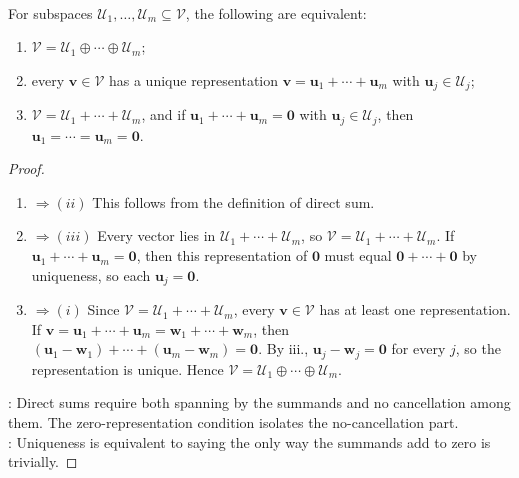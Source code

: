\begin{proposition} \label{prop:direct-sum-equivalent-conditions} \\
For subspaces $\mathcal{U}_1, \ldots, \mathcal{U}_m \subseteq \mathcal{V}$, the following are equivalent:
\begin{enumerate}[label=\roman*.]
\setlength{\itemsep}{0pt}
\item $\mathcal{V} = \mathcal{U}_1 \oplus \cdots \oplus \mathcal{U}_m$;
\item every $\mathbf{v} \in \mathcal{V}$ has a unique representation $\mathbf{v} = \mathbf{u}_1 + \cdots + \mathbf{u}_m$ with $\mathbf{u}_j \in \mathcal{U}_j$;
\item $\mathcal{V}=\mathcal{U}_1+\cdots+\mathcal{U}_m$, and if $\mathbf{u}_1 + \cdots + \mathbf{u}_m = \mathbf{0}$ with $\mathbf{u}_j \in \mathcal{U}_j$, then $\mathbf{u}_1 = \cdots = \mathbf{u}_m = \mathbf{0}$.
\end{enumerate}
\begin{proof}
\begin{enumerate}[label=(\roman)*.]
\setlength{\itemsep}{0pt}
\item[$(i)$]$\Rightarrow (ii)$ This follows from the definition of direct sum.
\item[$(ii)$]$\Rightarrow (iii)$ Every vector lies in $\mathcal{U}_1+\cdots+\mathcal{U}_m$, so $\mathcal{V}=\mathcal{U}_1+\cdots+\mathcal{U}_m$. If $\mathbf{u}_1+\cdots+\mathbf{u}_m=\mathbf{0}$, then this representation of $\mathbf{0}$ must equal $\mathbf{0}+\cdots+\mathbf{0}$ by uniqueness, so each $\mathbf{u}_j=\mathbf{0}$.
\item[$(iii)$]$\Rightarrow (i)$ Since $\mathcal{V}=\mathcal{U}_1+\cdots+\mathcal{U}_m$, every $\mathbf{v}\in\mathcal{V}$ has at least one representation. If $\mathbf{v}=\mathbf{u}_1+\cdots+\mathbf{u}_m=\mathbf{w}_1+\cdots+\mathbf{w}_m$, then $(\mathbf{u}_1-\mathbf{w}_1)+\cdots+(\mathbf{u}_m-\mathbf{w}_m)=\mathbf{0}$. By iii., $\mathbf{u}_j-\mathbf{w}_j=\mathbf{0}$ for every $j$, so the representation is unique. Hence $\mathcal{V}=\mathcal{U}_1\oplus\cdots\oplus\mathcal{U}_m$.
\end{enumerate}
: Direct sums require both spanning by the summands and no cancellation among them. The zero-representation condition isolates the no-cancellation part.\\
: Uniqueness is equivalent to saying the only way the summands add to zero is trivially.
\end{proof}
\end{proposition}

